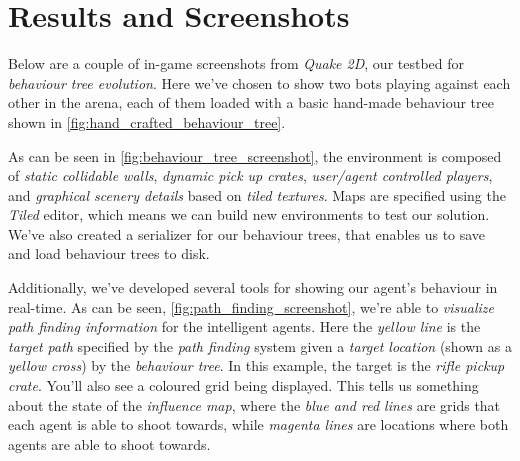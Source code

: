 \documentclass[a4paper, twocolumn]{article}
\begin{document}
    \clearpage

    \section{Results and Screenshots} \label{sec:results_and_screenshots}

        Below are a couple of in-game screenshots from \emph{Quake 2D}, our testbed for \emph{behaviour tree evolution}. Here we've chosen to show two bots playing against each other in the arena, each of them loaded with a basic hand-made behaviour tree shown in \cref{fig:hand_crafted_behaviour_tree}.

        As can be seen in \cref{fig:behaviour_tree_screenshot}, the environment is composed of \emph{static collidable walls}, \emph{dynamic pick up crates}, \emph{user/agent controlled players}, and \emph{graphical scenery details} based on \emph{tiled textures}. Maps are specified using the \emph{Tiled} editor, which means we can build new environments to test our solution. We've also created a serializer for our behaviour trees, that enables us to save and load behaviour trees to disk.

        Additionally, we've developed several tools for showing our agent's behaviour in real-time. As can be seen, \cref{fig:path_finding_screenshot}, we're able to \emph{visualize path finding information} for the intelligent agents. Here the \emph{yellow line} is the \emph{target path} specified by the \emph{path finding} system given a \emph{target location} (shown as a \emph{yellow cross}) by the \emph{behaviour tree}. In this example, the target is the \emph{rifle pickup crate}. You'll also see a coloured grid being displayed. This tells us something about the state of the \emph{influence map}, where the \emph{blue and red lines} are grids that each agent is able to shoot towards, while \emph{magenta lines} are locations where both agents are able to shoot towards.
\end{document}
